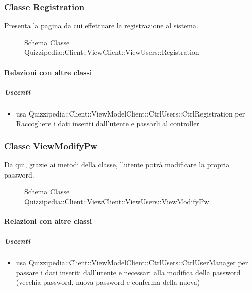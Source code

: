 \subsubsection{Classe Registration}
Presenta la pagina da cui effettuare la  registrazione al sistema.
\begin{figure}[H]
\centering
\noindent{}
\caption[Schema Classe Registration]{Schema Classe Quizzipedia::Client::ViewClient::ViewUsers::Registration}
\end{figure}
\paragraph{Relazioni con altre classi}
\subparagraph{Uscenti}
\begin{itemize}
\item usa Quizzipedia::Client::ViewModelClient::CtrlUsers::CtrlRegistration per Raccogliere i dati inseriti dall'utente e passarli al controller
\end{itemize}
\subsubsection{Classe ViewModifyPw}
Da qui, grazie ai metodi della classe, l'utente potrà modificare la propria password.
\begin{figure}[H]
\centering
\noindent{}
\caption[Schema Classe ViewModifyPw]{Schema Classe Quizzipedia::Client::ViewClient::ViewUsers::ViewModifyPw}
\end{figure}
\paragraph{Relazioni con altre classi}
\subparagraph{Uscenti}
\begin{itemize}
\item usa Quizzipedia::Client::ViewModelClient::CtrlUsers::CtrlUserManager per passare i dati inseriti dall'utente e necessari alla modifica della password (vecchia password, nuova password e conferma della nuova)
\end{itemize}
